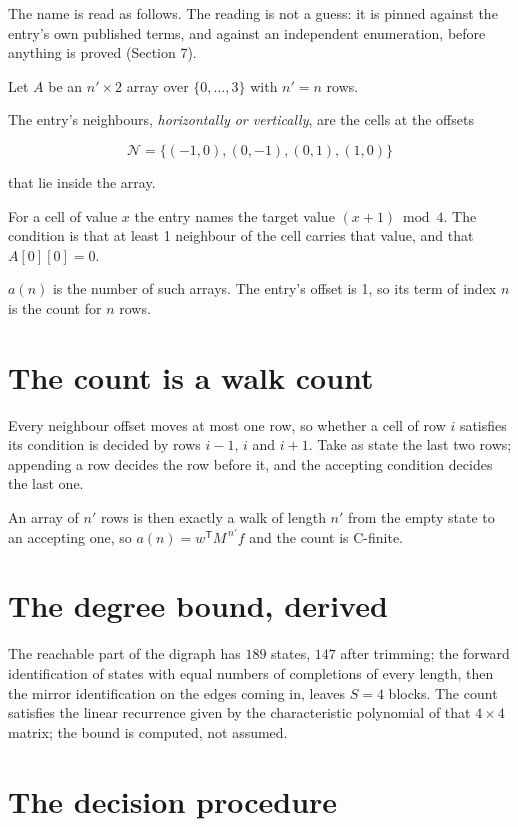 \documentclass[11pt]{article}
\theoremstyle{definition}
\begin{document}
The name is read as follows. The reading is not a guess: it is pinned against the entry's own published terms, and against an independent enumeration, before anything is proved (Section 7).

Let $A$ be an $n' \times 2$ array over $\{0,\dots,3\}$ with $n' = n$ rows.

The entry's neighbours, {\itshape horizontally or vertically}, are the cells at the offsets

\[\mathcal{N} = \{(-1,0), (0,-1), (0,1), (1,0)\}\]

that lie inside the array.

For a cell of value $x$ the entry names the target value $(x + 1) \bmod 4$. The condition is that at least 1 neighbour of the cell carries that value, and that $A[0][0] = 0$.

$a(n)$ is the number of such arrays. The entry's offset is 1, so its term of index $n$ is the count for $n$ rows.

\section{The count is a walk count}

Every neighbour offset moves at most one row, so whether a cell of row $i$ satisfies its condition is decided by rows $i-1$, $i$ and $i+1$. Take as state the last two rows; appending a row decides the row before it, and the accepting condition decides the last one.

An array of $n'$ rows is then exactly a walk of length $n'$ from the empty state to an accepting one, so $a(n) = w^{\mathsf T}M^{\,n'}f$ and the count is C-finite.

\section{The degree bound, derived}

The reachable part of the digraph has $189$ states, $147$ after trimming; the forward identification of states with equal numbers of completions of every length, then the mirror identification on the edges coming in, leaves $S = 4$ blocks. The count satisfies the linear recurrence given by the characteristic polynomial of that $4\times4$ matrix; the bound is computed, not assumed.

\section{The decision procedure}
\end{document}
